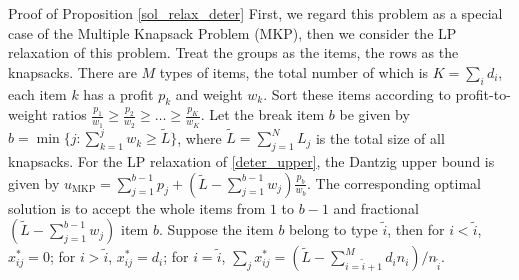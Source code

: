 \clearpage

\begin{pf}{Proof of Proposition \ref{sol_relax_deter}}
  First, we regard this problem as a special case of the Multiple Knapsack Problem (MKP), then we consider the LP relaxation of this problem.
  Treat the groups as the items, the rows as the knapsacks. There are $M$ types of items, the total number of which is $K = \sum_{i} d_i$, each item $k$ has a profit $p_k$ and weight $w_k$. 
  Sort these items according to profit-to-weight ratios $\frac{p_1}{w_1} \geq \frac{p_2}{w_2} \geq \ldots \geq \frac{p_K}{w_K}$. Let the break item $b$ be given by $b=\min \{j: \sum_{k=1}^j w_k \geq \tilde{L}\}$, where $\tilde{L} = \sum_{j=1}^{N} L_j$ is the total size of all knapsacks. 
  For the LP relaxation of \eqref{deter_upper}, the Dantzig upper bound \cite{dantzig1957discrete} is given by $u_{\mathrm{MKP}}=\sum_{j=1}^{b-1} p_j+\left(\tilde{L}-\sum_{j=1}^{b-1} w_j\right) \frac{p_b}{w_b}$. The corresponding optimal solution is to accept the whole items from $1$ to $b-1$ and fractional $(\tilde{L}-\sum_{j=1}^{b-1} w_j)$ item $b$. Suppose the item $b$ belong to type $\tilde{i}$, then for $i < \tilde{i}$, $x_{ij}^{*} = 0$; for $i > \tilde{i}$, $x_{ij}^{*} = d_{i}$; for $i = \tilde{i}$, $\sum_{j} x_{ij}^{*} = (\tilde{L} - \sum_{i = \tilde{i}+1}^{M} {d_i n_i})/ n_{\tilde{i}}$.
\end{pf}


